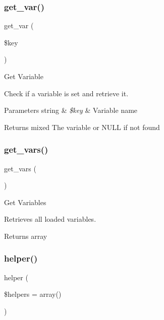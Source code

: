 \subsubsection{\texorpdfstring{get\+\_\+var()}{get\_var()}}
{\footnotesize\ttfamily get\+\_\+var (\begin{DoxyParamCaption}\item[{}]{\$key }\end{DoxyParamCaption})}

Get Variable

Check if a variable is set and retrieve it.


\begin{DoxyParams}[1]{Parameters}
string & {\em \$key} & Variable name \\
\hline
\end{DoxyParams}
\begin{DoxyReturn}{Returns}
mixed The variable or N\+U\+LL if not found 
\end{DoxyReturn}
\mbox{\label{class_c_i___loader_aff8505856d4aa461fcb3c0207d6a238f}} 
\subsubsection{\texorpdfstring{get\+\_\+vars()}{get\_vars()}}
{\footnotesize\ttfamily get\+\_\+vars (\begin{DoxyParamCaption}{ }\end{DoxyParamCaption})}

Get Variables

Retrieves all loaded variables.

\begin{DoxyReturn}{Returns}
array 
\end{DoxyReturn}
\mbox{\label{class_c_i___loader_a2da00ff269596262b62c0c6032b2996f}} 
\subsubsection{\texorpdfstring{helper()}{helper()}}
{\footnotesize\ttfamily helper (\begin{DoxyParamCaption}\item[{}]{\$helpers = {\ttfamily array()} }\end{DoxyParamCaption})}

